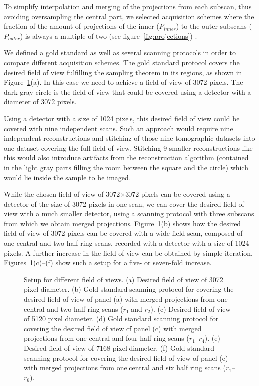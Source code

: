 To simplify interpolation and merging of the projections from each subscan, thus avoiding oversampling the central part, we selected acquisition schemes where the fraction of the amount of projections of the inner ($P_{inner}$) to the outer subscans ($P_{outer}$) is always a multiple of two (see figure~\ref{fig:projections})
.\cbdelete

\cbstart We defined a gold standard as well as several scanning protocols in order to compare different acquisition schemes. The \cbend gold standard protocol covers the desired field of view fulfilling the sampling theorem in its regions, as shown in Figure~\ref{fig:SubScan-Setup}(a). \cbdelete\cbstart In this case we need to achieve a field of view of 3072 pixels. The dark gray circle is the field of view that could be covered using a detector with a diameter of 3072 pixels.\cbend

Using a detector with a size of 1024 pixels, this desired field of view could be covered with nine independent scans. Such an approach would require nine independent reconstructions and stitching of those nine tomographic datasets into one dataset covering the full field of view. Stitching 9 smaller reconstructions like this would also introduce artifacts from the reconstruction algorithm (contained in the light gray parts filling the room between the square and the circle) which would lie inside the sample to be imaged.

While the chosen field of view of 3072$\times$3072 pixels can be covered using a detector of the size of 3072 pixels in one scan, we can cover the desired field of view with a much smaller detector, using a scanning protocol with three subscans from which we obtain merged projections. Figure~\ref{fig:SubScan-Setup}(b) shows how the desired field of view of 3072 pixels can be covered with a wide-field scan, composed of one central and two half ring-scans, recorded with a detector with a size of 1024 pixels. A further increase in the field of view can be obtained by simple iteration. Figures~\ref{fig:SubScan-Setup}(c)--(f) show such a setup for a five- or seven-fold increase.

\begin{figure}
	\centering
	\caption{Setup for different field of views. %
		(a) Desired field of view of 3072 pixel diameter. %
		(b) Gold standard scanning protocol for covering the desired field of view of panel (a) with merged projections from one central and two half ring scans ($r_{1}$ and $r_{2}$). %
		(c) Desired field of view of 5120 pixel diameter. %
		(d) Gold standard scanning protocol for covering the desired field of view of panel (c) with merged projections from one central and four half ring scans ($r_{1}$--$r_{4}$). %
		(e) Desired field of view of 7168 pixel diameter. %
		(f) Gold standard scanning protocol for covering the desired field of view of panel (e) with merged projections from one central and six half ring scans ($r_{1}$--$r_{6}$).}%
	\ifiucr		
		
	\else
	\fi
	\label{fig:SubScan-Setup}
\end{figure}

